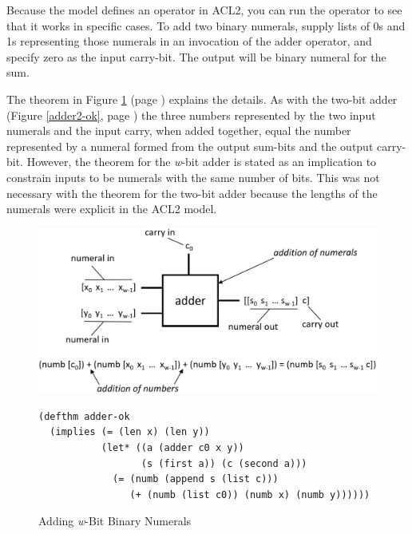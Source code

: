 Because the model defines an operator in ACL2,
you can run the operator to see that it works in specific cases.
To add two binary numerals, supply lists of 0s and 1s
representing those numerals in an invocation
of the adder operator, and specify zero as the input carry-bit.
The output will be binary numeral for the sum.

The theorem in Figure \ref{fig:adder-thm} (page \pageref{fig:adder-thm})
explains the details.
As with the two-bit adder (Figure \ref{adder2-ok}, page \pageref{adder2-ok})
the three numbers represented by the two input
numerals and the input carry, when added together,
equal the number represented
by a numeral formed from the output sum-bits and
the output carry-bit.
However, the theorem for the \emph{w}-bit adder
is stated as an implication to constrain
inputs to be numerals with the same number of bits.
This was not necessary with the theorem for the two-bit adder
because the lengths of the numerals were explicit in the ACL2 model.

\begin{figure}
\begin{center}
\includegraphics[scale=0.3]{Images/adder-thm.png}
\begin{Verbatim}
(defthm adder-ok
  (implies (= (len x) (len y))
           (let* ((a (adder c0 x y))
                  (s (first a)) (c (second a)))
             (= (numb (append s (list c)))
                (+ (numb (list c0)) (numb x) (numb y))))))
\end{Verbatim}
\end{center}
\caption{Adding \emph{w}-Bit Binary Numerals}
\label{fig:adder-thm}
\end{figure}


